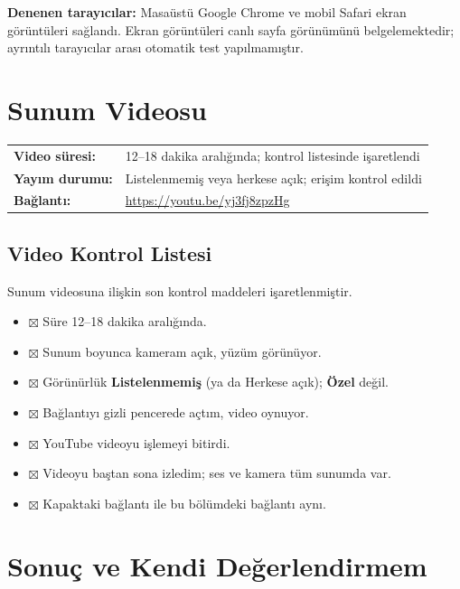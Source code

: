 \documentclass[12pt,a4paper]{article}
\newcommand{\youtubelink}{\href{https://youtu.be/yj3fj8zpzHg}{https://youtu.be/yj3fj8zpzHg}}
\begin{document}
\textbf{Denenen tarayıcılar:} Masaüstü Google Chrome ve mobil Safari ekran görüntüleri sağlandı. Ekran görüntüleri canlı sayfa görünümünü belgelemektedir; ayrıntılı tarayıcılar arası otomatik test yapılmamıştır.

\section{Sunum Videosu}
\begin{center}
\begin{tabular}{@{}ll@{}}
\textbf{Video süresi:} & 12--18 dakika aralığında; kontrol listesinde işaretlendi \\
\textbf{Yayım durumu:} & Listelenmemiş veya herkese açık; erişim kontrol edildi \\
\textbf{Bağlantı:} & \youtubelink \\
\end{tabular}
\end{center}

\subsection{Video Kontrol Listesi}
Sunum videosuna ilişkin son kontrol maddeleri işaretlenmiştir.
\begin{itemize}
  \item $\boxtimes$ Süre 12--18 dakika aralığında.
  \item $\boxtimes$ Sunum boyunca kameram açık, yüzüm görünüyor.
  \item $\boxtimes$ Görünürlük \textbf{Listelenmemiş} (ya da Herkese açık); \textbf{Özel} değil.
  \item $\boxtimes$ Bağlantıyı gizli pencerede açtım, video oynuyor.
  \item $\boxtimes$ YouTube videoyu işlemeyi bitirdi.
  \item $\boxtimes$ Videoyu baştan sona izledim; ses ve kamera tüm sunumda var.
  \item $\boxtimes$ Kapaktaki bağlantı ile bu bölümdeki bağlantı aynı.
\end{itemize}

\section{Sonuç ve Kendi Değerlendirmem}
\end{document}
